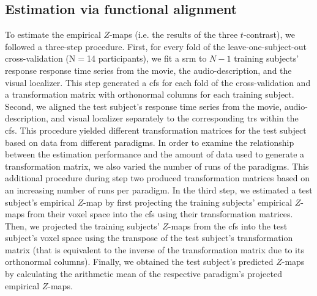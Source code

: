 \subsection{Estimation via functional alignment}
%
To estimate the empirical $Z$-maps (i.e. the results of the three $t$-contrast),
we followed a three-step procedure.
First, for every fold of the leave-one-subject-out cross-validation (N$=$14
participants), we fit a \ac{srm} to $N-1$ training subjects' response response
time series from the movie, the audio-description, and the visual localizer.
This step generated a \ac{cfs} for each fold of the cross-validation and a
transformation matrix with orthonormal columns for each training subject.
Second, we aligned the test subject's response time series from the movie,
audio-description, and visual localizer separately to the
corresponding \acp{tr} within the \ac{cfs}.
%
This procedure yielded different transformation matrices for the test subject
based on data from different paradigms.
In order to examine the relationship between the estimation performance and the
amount of data used to generate a transformation matrix, we also varied the
number of runs of the paradigms.
%
This additional procedure during step two produced transformation matrices based
on an increasing number of runs per paradigm.
%
In the third step, we estimated a test subject's empirical $Z$-map by first
projecting the training subjects' empirical $Z$-maps from their voxel space into
the \ac{cfs} using their transformation matrices.
Then, we projected the training subjects' $Z$-maps from the \ac{cfs} into the
test subject's voxel space using the transpose of the test subject's
transformation matrix (that is equivalent to the inverse of the transformation
matrix due to its orthonormal columns).
Finally, we obtained the test subject's predicted $Z$-maps by calculating the
arithmetic mean of the respective paradigm's projected empirical $Z$-maps.



